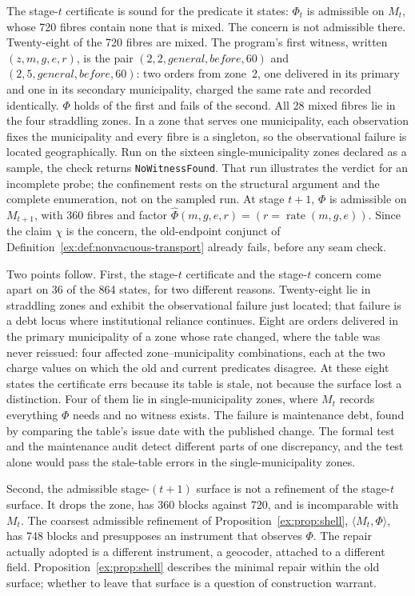 \documentclass[twocolumn,envcountsect,envcountsame,natbib]{svjour3}
\newcommand{\code}[1]{\texttt{#1}}
\begin{document}
The stage-$t$ certificate is sound for the predicate it states: $\Phi_t$ is admissible on $M_t$, whose 720 fibres contain none that is mixed. The concern is not admissible there. Twenty-eight of the 720 fibres are mixed. The program's first witness, written $(z,m,g,e,r)$, is the pair $(2,2,\mathit{general},\mathit{before},60)$ and $(2,5,\mathit{general},\mathit{before},60)$: two orders from zone~2, one delivered in its primary and one in its secondary municipality, charged the same rate and recorded identically. $\Phi$ holds of the first and fails of the second. All 28 mixed fibres lie in the four straddling zones. In a zone that serves one municipality, each observation fixes the municipality and every fibre is a singleton, so the observational failure is located geographically. Run on the sixteen single-municipality zones declared as a sample, the check returns \code{NoWitnessFound}. That run illustrates the verdict for an incomplete probe; the confinement rests on the structural argument and the complete enumeration, not on the sampled run. At stage $t+1$, $\Phi$ is admissible on $M_{t+1}$, with 360 fibres and factor $\widehat\Phi(m,g,e,r)=(r=\operatorname{rate}(m,g,e))$. Since the claim $\chi$ is the concern, the old-endpoint conjunct of Definition~\ref{ex:def:nonvacuous-transport} already fails, before any seam check.

Two points follow. First, the stage-$t$ certificate and the stage-$t$ concern come apart on 36 of the 864 states, for two different reasons. Twenty-eight lie in straddling zones and exhibit the observational failure just located; that failure is a debt locus where institutional reliance continues. Eight are orders delivered in the primary municipality of a zone whose rate changed, where the table was never reissued: four affected zone--municipality combinations, each at the two charge values on which the old and current predicates disagree. At these eight states the certificate errs because its table is stale, not because the surface lost a distinction. Four of them lie in single-municipality zones, where $M_t$ records everything $\Phi$ needs and no witness exists. The failure is maintenance debt, found by comparing the table's issue date with the published change. The formal test and the maintenance audit detect different parts of one discrepancy, and the test alone would pass the stale-table errors in the single-municipality zones.

Second, the admissible stage-$(t+1)$ surface is not a refinement of the stage-$t$ surface. It drops the zone, has 360 blocks against 720, and is incomparable with $M_t$. The coarsest admissible refinement of Proposition~\ref{ex:prop:shell}, $\langle M_t,\Phi\rangle$, has 748 blocks and presupposes an instrument that observes $\Phi$. The repair actually adopted is a different instrument, a geocoder, attached to a different field. Proposition~\ref{ex:prop:shell} describes the minimal repair within the old surface; whether to leave that surface is a question of construction warrant.
\end{document}

